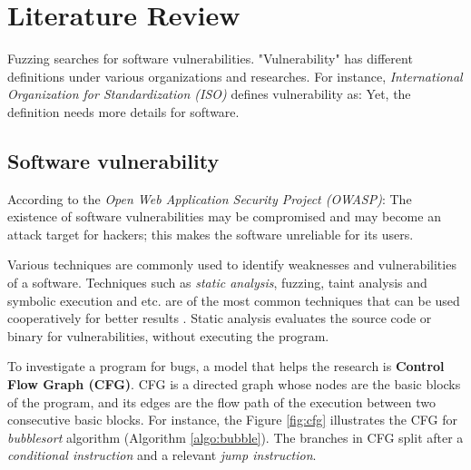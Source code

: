 \section{Literature Review} \label{sec:2.2}

Fuzzing searches for software vulnerabilities. "Vulnerability" has different definitions under various organizations and researches. For instance, \textit{International Organization for Standardization (ISO)} defines vulnerability as:  \cite{iso27008} Yet, the definition needs more details for software. 

\subsection*{Software vulnerability}

According to the \textit{Open Web Application Security Project (OWASP)}:  The existence of software vulnerabilities may be compromised and may become an attack target for hackers; this makes the software unreliable for its users. 

Various techniques are commonly used to identify weaknesses and vulnerabilities of a software. Techniques such as \textit{static analysis}, fuzzing, taint analysis and symbolic execution and etc. are of the most common techniques that can be used cooperatively for better results \cite{su2016vuldetection}. Static analysis evaluates the source code or binary for vulnerabilities, without executing the program.



To investigate a program for bugs, a model that helps the research is \textbf{Control Flow Graph (CFG)}. CFG is a directed graph whose nodes are the basic blocks of the program, and its edges are the flow path of the execution between two consecutive basic blocks. For instance, the Figure \ref{fig:cfg} illustrates the CFG for \textit{bubblesort} algorithm (Algorithm \ref{algo:bubble}). The branches in CFG split after a \textit{conditional instruction} and a relevant \textit{jump instruction}.

